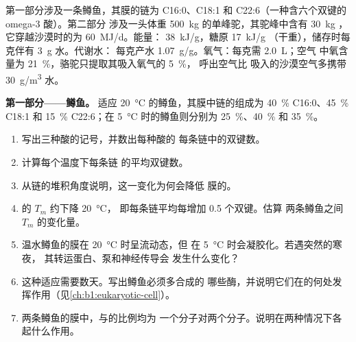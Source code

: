 \begin{problem}
\label{pb:b1:lipids:1}
第一部分涉及一条鳟鱼，其膜的链为
C16:0、C18:1 和 C22:6（一种含六个双键的 omega-3 酸）。第二部分
涉及一头体重 \qty{500}{kg} 的单峰驼，其驼峰中含有
\qty{30}{kg} ，它穿越沙漠时的为
\qty{60}{MJ/d}。能量： \qty{38}{kJ/g}，糖原 \qty{17}{kJ/g}
（干重），储存时每克伴有 \qty{3}{g} 水。代谢水：
每克产水 \qty{1.07}{g/g}。氧气：每克需 \qty{2.0}{L}；空气
中氧含量为 \qty{21}{\%}，骆驼只提取其吸入氧气的 \qty{5}{\%}，
呼出空气比
吸入的沙漠空气多携带 \qty{30}{g/m^3} 水。

\medskip
\noindent\textbf{第一部分——鳟鱼。}
适应 \qty{20}{\celsius} 的鳟鱼，其膜中链的组成为
\qty{40}{\%} C16:0、\qty{45}{\%} C18:1 和 \qty{15}{\%} C22:6；在
\qty{5}{\celsius} 时的鳟鱼则分别为 \qty{25}{\%}、\qty{40}{\%} 和 \qty{35}{\%}。
\begin{enumerate}
  \item 写出三种酸的记号，并数出每种酸的
        每条链中的双键数。
  \item 计算每个温度下每条链
        的平均双键数。
  \item 从链的堆积角度说明，这一变化为何会降低
        膜的。
  \item {}的 $T_m$ 约下降 \qty{20}{\celsius}，
        即每条链平均每增加 \qty{0.5}{} 个双键。估算
        两条鳟鱼之间 $T_m$ 的变化量。
  \item 温水鳟鱼的膜在 \qty{20}{\celsius} 时呈流动态，但
        在 \qty{5}{\celsius} 时会凝胶化。若遇突然的寒夜，
        其转运蛋白、泵和神经传导会
        发生什么变化？
  \item 这种适应需要数天。写出鳟鱼必须多合成的
        哪些酶，并说明它们在的何处发挥作用（见\cref{ch:b1:eukaryotic-cell}）。
  \item 两条鳟鱼的膜中，与的比例均为
        一个分子对两个分子。说明在两种情况下各起什么作用。
\end{enumerate}


\end{problem}
